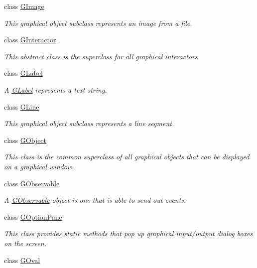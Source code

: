 \begin{DoxyCompactItemize}
class \mbox{\hyperlink{classsgl_1_1GImage}{G\+Image}}
\begin{DoxyCompactList}\small\item\em This graphical object subclass represents an image from a file. \end{DoxyCompactList}\item 
class \mbox{\hyperlink{classsgl_1_1GInteractor}{G\+Interactor}}
\begin{DoxyCompactList}\small\item\em This abstract class is the superclass for all graphical interactors. \end{DoxyCompactList}\item 
class \mbox{\hyperlink{classsgl_1_1GLabel}{G\+Label}}
\begin{DoxyCompactList}\small\item\em A \mbox{\hyperlink{classsgl_1_1GLabel}{G\+Label}} represents a text string. \end{DoxyCompactList}\item 
class \mbox{\hyperlink{classsgl_1_1GLine}{G\+Line}}
\begin{DoxyCompactList}\small\item\em This graphical object subclass represents a line segment. \end{DoxyCompactList}\item 
class \mbox{\hyperlink{classsgl_1_1GObject}{G\+Object}}
\begin{DoxyCompactList}\small\item\em This class is the common superclass of all graphical objects that can be displayed on a graphical window. \end{DoxyCompactList}\item 
class \mbox{\hyperlink{classsgl_1_1GObservable}{G\+Observable}}
\begin{DoxyCompactList}\small\item\em A \mbox{\hyperlink{classsgl_1_1GObservable}{G\+Observable}} object is one that is able to send out events. \end{DoxyCompactList}\item 
class \mbox{\hyperlink{classsgl_1_1GOptionPane}{G\+Option\+Pane}}
\begin{DoxyCompactList}\small\item\em This class provides static methods that pop up graphical input/output dialog boxes on the screen. \end{DoxyCompactList}\item 
class \mbox{\hyperlink{classsgl_1_1GOval}{G\+Oval}}

\end{DoxyCompactItemize}
